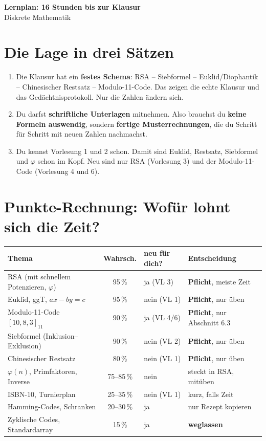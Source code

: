 
\pagestyle{fancy}\fancyhf{}



\begin{center}
{\LARGE\bfseries Lernplan: 16 Stunden bis zur Klausur}\\[4pt]
{\large Diskrete Mathematik}
\end{center}

\section*{Die Lage in drei Sätzen}
\begin{merke}
\begin{enumerate}
\item Die Klausur hat ein \textbf{festes Schema}: RSA -- Siebformel -- Euklid/Diophantik -- Chinesischer Restsatz -- Modulo-11-Code.
      Das zeigen die echte Klausur und das Gedächtnisprotokoll. Nur die Zahlen ändern sich.
\item Du darfst \textbf{schriftliche Unterlagen} mitnehmen. Also brauchst du \textbf{keine Formeln auswendig},
      sondern \textbf{fertige Musterrechnungen}, die du Schritt für Schritt mit neuen Zahlen nachmachst.
\item Du kennst Vorlesung 1 und 2 schon. Damit sind Euklid, Restsatz, Siebformel und $\varphi$ schon im Kopf.
      Neu sind nur RSA (Vorlesung 3) und der Modulo-11-Code (Vorlesung 4 und 6).
\end{enumerate}
\end{merke}

\section*{Punkte-Rechnung: Wofür lohnt sich die Zeit?}
\begin{tabular}{@{}p{5.2cm}cp{3.2cm}p{5.6cm}@{}}
\toprule
Thema & Wahrsch. & neu für dich? & Entscheidung\\
\midrule
RSA (mit schnellem Potenzieren, $\varphi$) & 95\,\% & ja (VL 3) & \textbf{Pflicht}, meiste Zeit\\
Euklid, ggT, $ax - by = c$ & 95\,\% & nein (VL 1) & \textbf{Pflicht}, nur üben\\
Modulo-11-Code $[10,8,3]_{11}$ & 90\,\% & ja (VL 4/6) & \textbf{Pflicht}, nur Abschnitt 6.3\\
Siebformel (Inklusion--Exklusion) & 90\,\% & nein (VL 2) & \textbf{Pflicht}, nur üben\\
Chinesischer Restsatz & 80\,\% & nein (VL 1) & \textbf{Pflicht}, nur üben\\
$\varphi(n)$, Primfaktoren, Inverse & 75--85\,\% & nein & steckt in RSA, mitüben\\
ISBN-10, Turnierplan & 25--35\,\% & nein (VL 1) & kurz, falls Zeit\\
Hamming-Codes, Schranken & 20--30\,\% & ja & nur Rezept kopieren\\
Zyklische Codes, Standardarray & 15\,\% & ja & \textbf{weglassen}\\
\bottomrule
\end{tabular}

